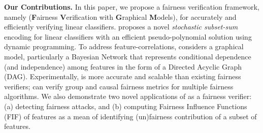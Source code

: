 	
	

	

	
	
%	
%	
	

	
	
	\textbf{Our Contributions.} In this paper, we propose a fairness verification framework, namely {\fvgm} (\textbf{F}airness \textbf{V}erification with \textbf{G}raphical \textbf{M}odels), for accurately and efficiently verifying linear classifiers. {\fvgm} proposes a novel \textit{stochastic subset-sum} encoding for linear classifiers with an efficient pseudo-polynomial solution using dynamic programming. To address feature-correlations, {\fvgm} considers a graphical model, particularly a Bayesian Network that represents conditional dependence (and independence) among features in the form of a Directed Acyclic Graph (DAG).  
	Experimentally,  {\fvgm} is more accurate and scalable than existing fairness verifiers; {\fvgm} can verify group and causal fairness metrics for multiple fairness algorithms. We also demonstrate two novel applications of {\fvgm} as a fairness verifier: (a) detecting fairness attacks, and (b) computing Fairness Influence Functions (FIF) of features as a mean of identifying (un)fairness contribution of a subset of features. 
	


